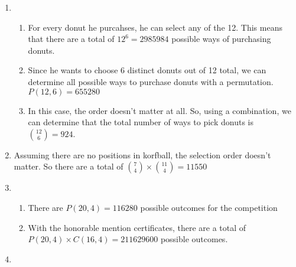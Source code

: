 \documentclass[12pt]{article}
\begin{document}
\begin{enumerate}
  \item 
    \begin{enumerate}
      \item For every donut he purcahses, he can select any of the 12. This means that there are a total of $12^6 = 2985984$ possible ways of purchasing donuts.
      \item Since he wants to choose 6 distinct donuts out of 12 total, we can determine all possible ways to purchase donuts with a permutation. $P(12, 6) = 655280$
      \item In this case, the order doesn't matter at all. So, using a combination, we can determine that the total number of ways to pick donuts is $\binom{12}{6} = 924$.
    \end{enumerate}
  \item Assuming there are no positions in korfball, the selection order doesn't matter. So there are a total of $\binom{7}{4} \times \binom{11}{4} = 11550$
  \item
    \begin{enumerate}
      \item There are $P(20,4) = 116280$ possible outcomes for the competition
      \item With the honorable mention certificates, there are a total of $P(20,4) \times C(16,4) = 211629600$ possible outcomes.
    \end{enumerate}

  \setcounter{enumi}{14}
  
  \item
\end{enumerate}
\end{document}
